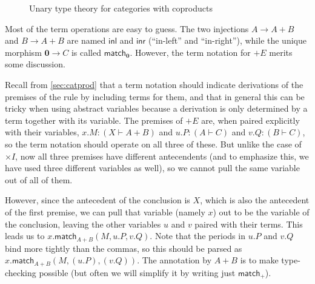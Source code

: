 \documentclass{book}
\def\idfunc{\mathsf{id}}
\let\types\vdash
\def\type{\;\ftype}
\def\timesI{\ensuremath{\mathord{\times}I}}
\def\plusE{\mathord{+}E}
\def\plusI{\mathord{+}I}
\def\inl{\mathsf{inl}}
\def\inr{\mathsf{inr}}
\def\acase#1#2{\mathsf{match}_{#1+#2}}
\def\case{\mathsf{match}_+}
\def\match{\mathsf{match}}
\def\zero{\mathbf{0}}
\def\zeroE{\mathbf{0}E}
\def\abort{\match_{\zero}}
\begin{document}
\begin{figure}
  \centering
  \caption{Unary type theory for categories with coproducts}
  \label{fig:catcoprod}
\end{figure}

Most of the term operations are easy to guess.
The two injections $A\to A+B$ and $B\to A+B$ are named $\inl$ and $\inr$ (``in-left'' and ``in-right''), while the unique morphism $\zero \to C$ is called $\abort$.
However, the term notation for $\plusE$ merits some discussion.

Recall from \cref{sec:catprod} that a term notation should indicate derivations of the premises of the rule by including terms for them, and that in general this can be tricky when using abstract variables because a derivation is only determined by a term together with its variable.
The premises of $\plusE$ are, when paired explicitly with their variables, $x.M:(X\types A+B)$ and $u.P:(A\types C)$ and $v.Q:(B\types C)$, so the term notation should operate on all three of these.
But unlike the case of $\timesI$, now all three premises have different antecendents (and to emphasize this, we have used three different variables as well), so we cannot pull the same variable out of all of them.

However, since the antecedent of the conclusion is $X$, which is also the antecedent of the first premise, we can pull that variable (namely $x$) out to be the variable of the conclusion, leaving the other variables $u$ and $v$ paired with their terms.
This leads us to $x.\acase AB(M,u.P,v.Q)$.
Note that the periods in $u.P$ and $v.Q$ bind more tightly than the commas, so this should be parsed as $x.\acase AB(M,(u.P),(v.Q))$.
The annotation by $A+B$ is to make type-checking possible (but often we will simplify it by writing just $\case$).
\end{document}
